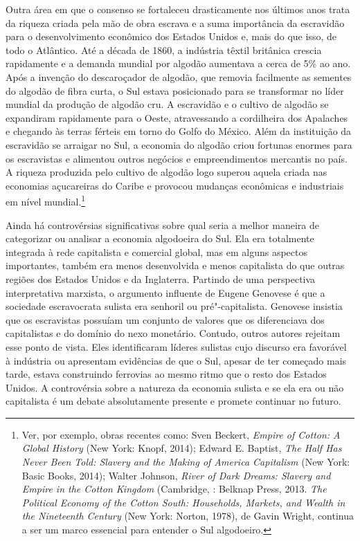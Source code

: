 Outra área em que o consenso se fortaleceu drasticamente nos últimos
anos trata da riqueza criada pela mão de obra escrava e a suma
importância da escravidão para o desenvolvimento econômico dos Estados
Unidos e, mais do que isso, de todo o Atlântico. Até a década de 1860, a
indústria têxtil britânica crescia rapidamente e a demanda mundial por
algodão aumentava a cerca de 5\% ao ano. Após a invenção do descaroçador
de algodão, que removia facilmente as sementes do algodão de fibra
curta, o Sul estava posicionado para se transformar no líder mundial da
produção de algodão cru. A escravidão e o cultivo de algodão se
expandiram rapidamente para o Oeste, atravessando a cordilheira dos
Apalaches e chegando às terras férteis em torno do Golfo do México. Além
da instituição da escravidão se arraigar no Sul, a economia do algodão
criou fortunas enormes para os escravistas e alimentou outros negócios e
empreendimentos mercantis no país. A riqueza produzida pelo cultivo de
algodão logo superou aquela criada nas economias açucareiras do Caribe e
provocou mudanças econômicas e industriais em nível mundial.\footnote{Ver,
  por exemplo, obras recentes como: Sven Beckert, \emph{Empire of
  Cotton: A Global History} (New York: Knopf, 2014); Edward E. Baptist,
  \emph{The Half Has Never Been Told: Slavery and the Making of America
  Capitalism} (New York: Basic Books, 2014); Walter Johnson, \emph{River
  of Dark Dreams: Slavery and Empire in the Cotton Kingdom} (Cambridge,
  : Belknap Press, 2013. \emph{The Political Economy of the Cotton
  South: Households, Markets, and Wealth in the Nineteenth Century} (New
  York: Norton, 1978), de Gavin Wright, continua a ser um marco
  essencial para entender o Sul algodoeiro.}

Ainda há controvérsias significativas sobre qual seria a melhor maneira
de categorizar ou analisar a economia algodoeira do Sul. Ela era
totalmente integrada à rede capitalista e comercial global, mas em
alguns aspectos importantes, também era menos desenvolvida e menos
capitalista do que outras regiões dos Estados Unidos e da Inglaterra.
Partindo de uma perspectiva interpretativa marxista, o argumento
influente de Eugene Genovese é que a sociedade escravocrata sulista era
senhoril ou pré"-capitalista. Genovese insistia que os escravistas
possuíam um conjunto de valores que os diferenciava dos capitalistas e
do domínio do nexo monetário. Contudo, outros autores rejeitam esse
ponto de vista. Eles identificaram líderes sulistas cujo discurso era
favorável à indústria ou apresentam evidências de que o Sul, apesar de
ter começado mais tarde, estava construindo ferrovias ao mesmo ritmo que
o resto dos Estados Unidos. A controvérsia sobre a natureza da economia
sulista e se ela era ou não capitalista é um debate absolutamente
presente e promete continuar no futuro.

